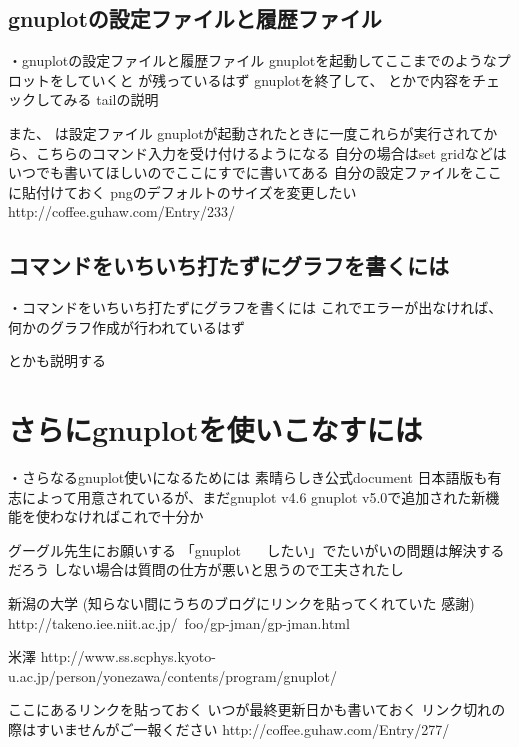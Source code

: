 \documentclass[12pt,a4paper]{jarticle}
\begin{document}
\subsection{gnuplotの設定ファイルと履歴ファイル}
・gnuplotの設定ファイルと履歴ファイル
gnuplotを起動してここまでのようなプロットをしていくと
が残っているはず
gnuplotを終了して、
とかで内容をチェックしてみる
tailの説明

また、
は設定ファイル
gnuplotが起動されたときに一度これらが実行されてから、こちらのコマンド入力を受け付けるようになる
自分の場合はset gridなどはいつでも書いてほしいのでここにすでに書いてある
自分の設定ファイルをここに貼付けておく
pngのデフォルトのサイズを変更したい
http://coffee.guhaw.com/Entry/233/


\subsection{コマンドをいちいち打たずにグラフを書くには}
・コマンドをいちいち打たずにグラフを書くには
これでエラーが出なければ、何かのグラフ作成が行われているはず

とかも説明する

\section{さらにgnuplotを使いこなすには}
・さらなるgnuplot使いになるためには
素晴らしき公式document
日本語版も有志によって用意されているが、まだgnuplot v4.6
gnuplot v5.0で追加された新機能を使わなければこれで十分か

グーグル先生にお願いする
「gnuplot ~~~したい」でたいがいの問題は解決するだろう
しない場合は質問の仕方が悪いと思うので工夫されたし

新潟の大学
(知らない間にうちのブログにリンクを貼ってくれていた 感謝)
http://takeno.iee.niit.ac.jp/~foo/gp-jman/gp-jman.html

米澤
http://www.ss.scphys.kyoto-u.ac.jp/person/yonezawa/contents/program/gnuplot/

ここにあるリンクを貼っておく
いつが最終更新日かも書いておく
リンク切れの際はすいませんがご一報ください
http://coffee.guhaw.com/Entry/277/
\end{document}
